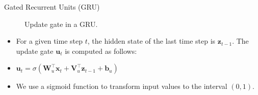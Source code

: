 \begin{vbframe}{Gated Recurrent Units (GRU)}
    \begin{figure}
      \centering
      \caption{\footnotesize{Update gate in a GRU.}}
  \end{figure}
  \begin{itemize}
    \item For a given time step $t$, the hidden state of the last time step is $\mathbf{z}_{t-1}$. The update gate $\mathbf{u}_t$ is computed as follows:
   \item $\mathbf{u}_t = \sigma(\bm{W}_{u}^\top \mathbf{x}_t + \bm{V}_{u}^\top \mathbf{z}_{t-1}  + \mathbf{b}_u)$
    \item We use a sigmoid function to transform input values to the interval $(0,1)$.
  \end{itemize}
\end{vbframe}


